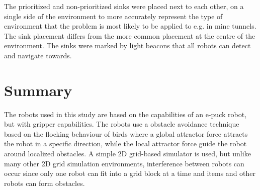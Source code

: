 The prioritized and non-prioritized sinks were placed next to each other, on a single side of the environment to more accurately represent the type of environment that the problem is most likely to be applied to e.g. in mine tunnels. The sink placement differs from the more common placement at the centre of the environment. The sinks were marked by light beacons that all robots can detect and navigate towards.


\section{Summary}
\label{robots:summary}
The robots used in this study are based on the capabilities of an e-puck robot, but with gripper capabilities. The robots use a obstacle avoidance technique based on the flocking behaviour of birds where a global attractor force attracts the robot in a specific direction, while the local attractor force guide the robot around localized obstacles. A simple 2D grid-based simulator is used, but unlike many other 2D grid simulation environments, interference between robots can occur since only one robot can fit into a grid block at a time and items and other robots can form obstacles. 
